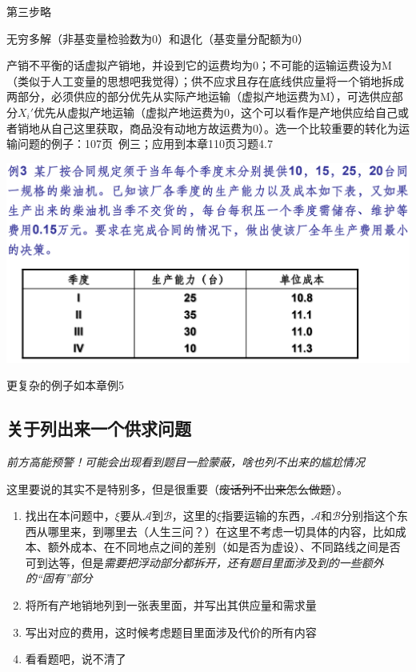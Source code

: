 \documentclass[]{report}
\begin{document}
		第三步略\par
		无穷多解（非基变量检验数为0）和退化（基变量分配额为0）\par
		产销不平衡的话虚拟产销地，并设到它的运费均为0；不可能的运输运费设为M（类似于人工变量的思想吧我觉得）；供不应求且存在底线供应量将一个销地拆成两部分，必须供应的部分优先从实际产地运输（虚拟产地运费为M），可选供应部分$X_i'$优先从虚拟产地运输（虚拟产地运费为0，这个可以看作是产地供应给自己或者销地从自己这里获取，商品没有动地方故运费为0）。选一个比较重要的转化为运输问题的例子：107页\  例三；应用到本章110页习题4.7\par
		\includegraphics[scale = 0.3]{pictures/P107_Example3.png}\par
		更复杂的例子如本章例5
		\subsection{关于列出来一个供求问题}
		\indent\textsf{\textit{前方高能预警！可能会出现看到题目一脸蒙蔽，啥也列不出来的尴尬情况}}\par
		这里要说的其实不是特别多，但是很重要（\sout{废话列不出来怎么做题}）。\par
		\begin{enumerate}
			\item 找出在本问题中，$\xi$要从$\mathscr{A}$到$\mathscr{B}$，这里的$\xi$指要运输的东西，$\mathscr{A}$和$\mathscr{B}$分别指这个东西从哪里来，到哪里去（人生三问？）在这里不考虑一切具体的内容，比如成本、额外成本、在不同地点之间的差别（如是否为虚设）、不同路线之间是否可到达等，但是\textit{需要把浮动部分都拆开，还有题目里面涉及到的一些额外的“固有”部分}
			\item 将所有产地销地列到一张表里面，并写出其供应量和需求量
			\item 写出对应的费用，这时候考虑题目里面涉及代价的所有内容
			\item 看看题吧，说不清了
		\end{enumerate}
\end{document}
